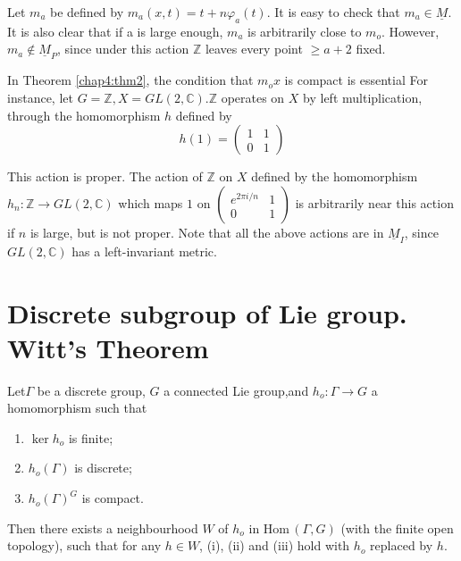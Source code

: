  Let $m_a$ be defined by $m_a (x,t)= t+n \varphi_a(t)$. It is easy to
 check that $m_a \in \underline{M}$. It is also  clear that if a is
 large enough, $m_a$ is arbitrarily close to $m_o$.  However, $m_a \not\in
 \underline{M}_P$, since under this action $\mathbb{Z}$ leaves every
 point $\ge a+2$ fixed. 

\begin{rem}%
  In Theorem \ref{chap4:thm2}, the condition that $m_o  x$ is compact is essential
  For instance, let $G= \mathbb{Z},X= GL(2, \mathbb{C}). \mathbb{Z}$
  operates on $X$ by left multiplication, through the homomorphism $h$
  defined by  
  $$
  h(1)=
  \begin{pmatrix}
    1&1\\
    0&1
  \end{pmatrix}
  $$
\end{rem}  

    This action is proper. The action of $\mathbb{Z}$ on $X$ defined
    by the homomorphism $h_n: \mathbb{Z} \to GL(2, \mathbb{C})$ which
    maps $1$ on $\begin{pmatrix} e^{2 \pi i/n} &1\\ 0
      &1 \end{pmatrix}$ is arbitrarily near this action if $n$ is
    large, but is not proper. Note that all the above actions are in
    $\underline{M}_I$, since $GL(2, \mathbb{C})$ has a left-invariant
    metric.  
    
\section{Discrete subgroup of Lie group. Witt's Theorem}%

\begin{thm}\label{chap4:thm3}%
  Let\pageoriginale $\Gamma$ be a discrete group, $G$ a connected
  Lie group,and $h_o: \Gamma \to G$ a homomorphism such that  
  \begin{enumerate}[\rm(i)]
  \item $\ker h_o$ is finite;
  \item $h_o (\Gamma)$ is discrete;
  \item $h_o(\Gamma)^G$ is compact.
  \end{enumerate}
\end{thm}

Then there exists a neighbourhood $W$ of $h_o$ in Hom\,$( \Gamma,G)$
(with the  finite open topology), such that for any  $h \in W$, (i),
(ii) and (iii) hold with $h_o$ replaced by $h$. 

